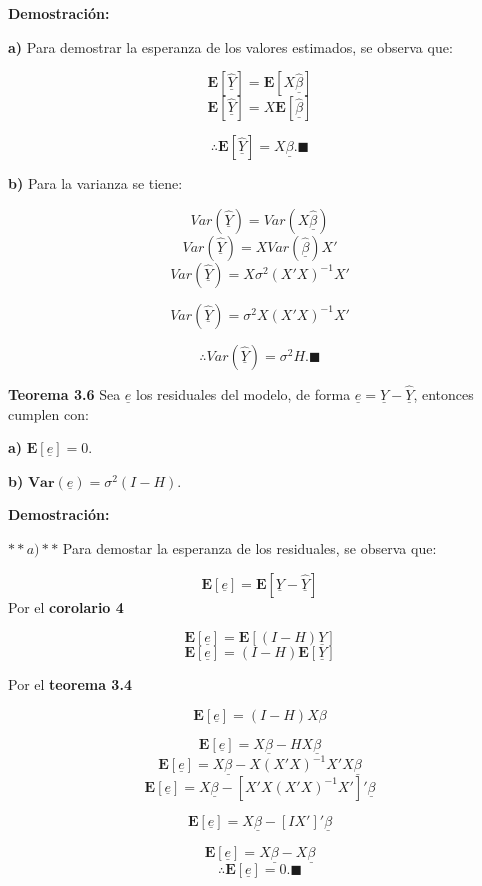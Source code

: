 \documentclass[
  a4paper,
  oneside,
  openany]{book}
\begin{document}
\textbf{Demostración:}

\textbf{a)} Para demostrar la esperanza de los valores estimados, se observa que:

\[
\mathbf{E}[\underline{\hat{Y}}]=\mathbf{E}[X\underline{\hat{\beta}}]
\]
\[
\mathbf{E}[\underline{\hat{Y}}]=X\mathbf{E}[\underline{\hat{\beta}}]
\]

\[
\therefore \mathbf{E}[\underline{\hat{Y}}]=X\underline{\beta}. \blacksquare
\]

\textbf{b)} Para la varianza se tiene:

\[
Var(\underline{\hat{Y}})=Var(X\underline{\hat{\beta}})
\]
\[
Var(\underline{\hat{Y}})=XVar(\underline{\hat{\beta}})X'
\]
\[
Var(\underline{\hat{Y}})=X\sigma^2(X'X)^{-1}X'
\]

\[
Var(\underline{\hat{Y}})=\sigma^2X(X'X)^{-1}X'
\]

\[
\therefore Var(\underline{\hat{Y}})=\sigma^2H.\blacksquare
\]

\textbf{Teorema 3.6} Sea \(\underline{e}\) los residuales del modelo, de forma \(\underline{e}=\underline{Y}-\underline{\hat{Y}}\), entonces cumplen con:

\textbf{a)} \(\mathbf{E}[\underline{e}]=0.\)

\textbf{b)} \(\textbf{Var}(\underline{e})=\sigma^2(I-H).\)

\textbf{Demostración:}

\(**a)**\) Para demostar la esperanza de los residuales, se observa que:

\[
\mathbf{E}[\underline{e}]=\mathbf{E}[\underline{Y}-\underline{\hat{Y}}]
\]
Por el \textbf{corolario 4}

\[
\mathbf{E}[\underline{e}]=\mathbf{E}[(I-H)\underline{Y}]
\]
\[
\mathbf{E}[\underline{e}]=(I-H)\mathbf{E}[\underline{Y}]
\]

Por el \textbf{teorema 3.4}

\[
\mathbf{E}[\underline{e}]=(I-H)X\beta
\]

\[
\mathbf{E}[\underline{e}]=X\underline{\beta}-HX\underline{\beta}
\]
\[
\mathbf{E}[\underline{e}]=X\underline{\beta}-X(X'X)^{-1}X'X\underline{\beta}
\]
\[
\mathbf{E}[\underline{e}]=X\underline{\beta}-\left[X'X(X'X)^{-1}X'\right]'\underline{\beta}
\]

\[
\mathbf{E}[\underline{e}]=X\underline{\beta}-[IX']'\underline{\beta}
\]

\[
\mathbf{E}[\underline{e}]=X\underline{\beta}-X\underline{\beta}
\]
\[
\therefore \mathbf{E}[\underline{e}]=0. \blacksquare
\]
\end{document}
